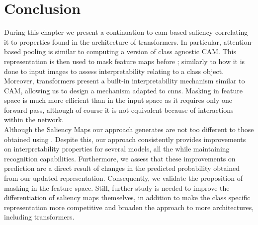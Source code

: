 \section{Conclusion}
\label{sec:ca_conclusion}
During this chapter we present a continuation to \gls{cam}-based saliency correlating it to 
properties found in the architecture of transformers. In particular, attention-based pooling is 
similar to computing a version of class agnostic CAM. This representation is then 
used to mask feature maps before \gap; similarly to how  it is done to input images to assess 
interpretability relating to a class object. Moreover, transformers present a built-in 
interpretability mechanism similar to CAM, allowing us to design a mechanism adapted to 
\glspl{cnn}. Masking in feature space is much more efficient than in the input space as it requires 
only one forward pass, although of course it is not equivalent because of interactions within the 
network.\\

\noindent Although the Saliency Maps our approach generates are not too different to those obtained 
using \gap. Despite this, our approach consistently provides improvements on interpretability 
properties for several models, all the while maintaining recognition capabilities. Furthermore, we 
assess that these improvements on prediction are a direct result of changes in the 
predicted probability obtained from our updated representation. Consequently, we validate the 
proposition of masking in the feature space. Still, further study is needed to improve the 
differentiation of saliency maps themselves, in addition to make the class specific representation 
more competitive and broaden the approach to more architectures, including transformers.

